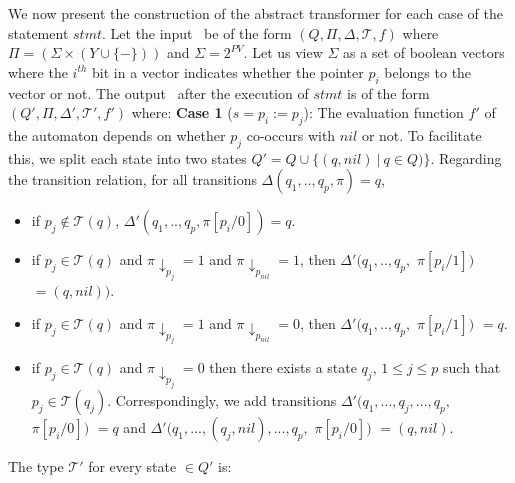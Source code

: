 \documentclass{llncs}
\begin{document}
We now present the construction of the abstract transformer for each case of the statement $stmt$. 
Let the input \QSDA\ be of the form $(Q, \Pi, \Delta, \mathcal{T}, f)$ where $\Pi = (\Sigma \times (Y \cup \{-\}))$ and $\Sigma = 2^{PV}$. Let us view $\Sigma$ as a set of boolean vectors where the $i^{th}$ bit in a vector indicates whether the pointer $p_i$ belongs to the vector or not.
The output \QSDA\ after the execution of $stmt$ is of the form $(Q', \Pi, \Delta', \mathcal{T'}, f')$ where:
\newline\newline
{\bf Case 1} ($s = p_i := p_j$): 
The evaluation function $f'$ of the automaton depends on whether $p_j$ co-occurs with ${nil}$ or not. To facilitate this, we split each state into two states $Q' = Q \cup \{(q, nil)~|~q \in Q)\}$. 
 Regarding the transition relation, for all transitions $\Delta(q_1, .., q_p, \pi) = q$,
\begin{itemize}
\item if $p_j \not\in \mathcal{T}(q)$, $\Delta'(q_1, .., q_p, \pi[p_i/0]) = q$.
\item if $p_j \in \mathcal{T}(q)$ and $\pi \downarrow_{p_j} = 1$ and $\pi \downarrow_{p_{nil}} = 1$, then $\Delta'(q_1, .., q_p,$ $\pi[p_i/1])$ $  = (q, nil))$.
\item if $p_j \in \mathcal{T}(q)$ and $\pi \downarrow_{p_j} = 1$ and $\pi \downarrow_{p_{nil}} = 0$, then $\Delta'(q_1, .., q_p,$ $\pi[p_i/1])$ $ = q$.

\item if $p_j \in \mathcal{T}(q)$ and $\pi \downarrow_{p_j} = 0$ then there exists a state $q_j$, $1 \leq j \leq p$ such that $p_j \in \mathcal{T}(q_j)$. Correspondingly, we add transitions $\Delta'(q_1, ..., q_j, ..., q_p,$ $\pi[p_i/0])$ $ = q$ and $\Delta'(q_1, ..., (q_j, nil), ..., q_p,$ $\pi[p_i/0])$ $ = (q, nil)$.
\end{itemize}

The type $\mathcal{T'}$ for every state $\in Q'$ is:
\end{document}
